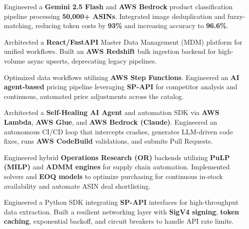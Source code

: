 \documentclass[letterpaper,10pt]{article}
\begin{document}
\begin{resume_list}
    \item{Engineered a \textbf{Gemini 2.5 Flash} and \textbf{AWS Bedrock} product classification pipeline processing \textbf{50,000+ ASINs}. Integrated image deduplication and fuzzy-matching, reducing token costs by \textbf{93\%} and increasing accuracy to \textbf{96.6\%}.}
    \item{Architected a \textbf{React/FastAPI} Master Data Management (MDM) platform for unified workflows. Built an \textbf{AWS Redshift} bulk ingestion backend for high-volume async upserts, deprecating legacy pipelines.}
    \item{Optimized data workflows utilizing \textbf{AWS Step Functions}. Engineered an \textbf{AI agent-based} pricing pipeline leveraging \textbf{SP-API} for competitor analysis and continuous, automated price adjustments across the catalog.}
    \item{Architected a \textbf{Self-Healing AI Agent} and automation SDK via \textbf{AWS Lambda}, \textbf{AWS Glue}, and \textbf{AWS Bedrock (Claude)}. Engineered an autonomous CI/CD loop that intercepts crashes, generates LLM-driven code fixes, runs \textbf{AWS CodeBuild} validations, and submits Pull Requests.}
    \item{Engineered hybrid \textbf{Operations Research (OR)} backends utilizing \textbf{PuLP (MILP)} and \textbf{ADMM engines} for supply chain automation. Implemented solvers and \textbf{EOQ models} to optimize purchasing for continuous in-stock availability and automate ASIN deal shortlisting.}
    \item{Engineered a Python SDK integrating \textbf{SP-API} interfaces for high-throughput data extraction. Built a resilient networking layer with \textbf{SigV4 signing}, \textbf{token caching}, exponential backoff, and circuit breakers to handle API rate limits.}
\end{resume_list}
\end{document}
